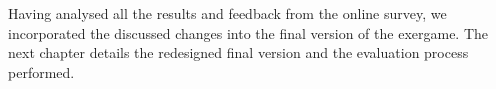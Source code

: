 \begin{enumerate}
\end{enumerate}
Having analysed all the results and feedback from the online survey, we incorporated the discussed changes into the final version of the exergame. The next chapter details the redesigned final version and the evaluation process performed.